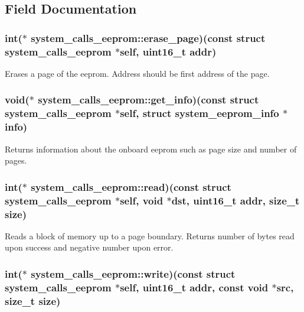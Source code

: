 \subsection{Field Documentation}
\hypertarget{structsystem__calls__eeprom_acb465a4f40b9f5db82b1afd12a76540f}{
\subsubsection[{erase\+\_\+page}]{\setlength{\rightskip}{0pt plus 5cm}int($\ast$ system\+\_\+calls\+\_\+eeprom\+::erase\+\_\+page)(const struct {\bf system\+\_\+calls\+\_\+eeprom} $\ast$self, uint16\+\_\+t {\bf addr})}}\label{structsystem__calls__eeprom_acb465a4f40b9f5db82b1afd12a76540f}
Erases a page of the eeprom. Address should be first address of the page. \hypertarget{structsystem__calls__eeprom_a579cab4e2df5260c2f9ef99138e5c195}{
\subsubsection[{get\+\_\+info}]{\setlength{\rightskip}{0pt plus 5cm}void($\ast$ system\+\_\+calls\+\_\+eeprom\+::get\+\_\+info)(const struct {\bf system\+\_\+calls\+\_\+eeprom} $\ast$self, struct {\bf system\+\_\+eeprom\+\_\+info} $\ast$info)}}\label{structsystem__calls__eeprom_a579cab4e2df5260c2f9ef99138e5c195}
Returns information about the onboard eeprom such as page size and number of pages. \hypertarget{structsystem__calls__eeprom_a50c4197d24c30fa3781ec7ec1636c8c6}{
\subsubsection[{read}]{\setlength{\rightskip}{0pt plus 5cm}int($\ast$ system\+\_\+calls\+\_\+eeprom\+::read)(const struct {\bf system\+\_\+calls\+\_\+eeprom} $\ast$self, void $\ast$dst, uint16\+\_\+t {\bf addr}, size\+\_\+t size)}}\label{structsystem__calls__eeprom_a50c4197d24c30fa3781ec7ec1636c8c6}
Reads a block of memory up to a page boundary. Returns number of bytes read upon success and negative number upon error. \hypertarget{structsystem__calls__eeprom_a927d9e44a9dd2dcf2d9aa5623954ef07}{
\subsubsection[{write}]{\setlength{\rightskip}{0pt plus 5cm}int($\ast$ system\+\_\+calls\+\_\+eeprom\+::write)(const struct {\bf system\+\_\+calls\+\_\+eeprom} $\ast$self, uint16\+\_\+t {\bf addr}, const void $\ast$src, size\+\_\+t size)}}\label{structsystem__calls__eeprom_a927d9e44a9dd2dcf2d9aa5623954ef07}
